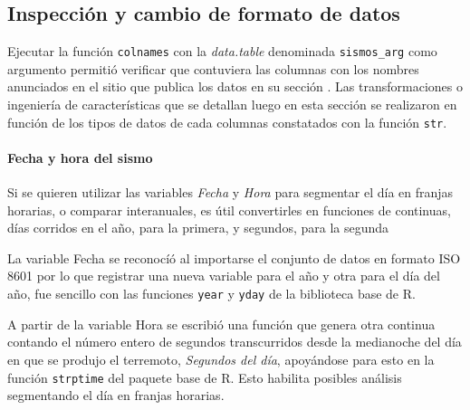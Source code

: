 \documentclass[a4paper]{report}
\begin{document}
\subsection{Inspección y cambio de formato de datos}\label{sec:formateo}
Ejecutar la función \lstinline[language=R,breaklines=true,basicstyle=\ttfamily]'colnames' con la \emph{data.table} denominada \lstinline[language=R,breaklines=true,basicstyle=\ttfamily]'sismos_arg' como argumento permitió verificar que contuviera las columnas con los nombres anunciados en el sitio que publica los datos en su sección \cite[Exploración inicial]{daniela_parada_ic-datasets-docencia_nodate}.
Las transformaciones o ingeniería de características que se detallan luego en esta sección se realizaron en función de los tipos de datos de cada columnas constatados con la función \lstinline[language=R,breaklines=true,basicstyle=\ttfamily]'str'.


\paragraph{Fecha y hora del sismo}
Si se quieren utilizar las variables \emph{Fecha} y \emph{Hora} para segmentar el día en franjas horarias, o comparar interanuales, es útil convertirles en funciones de continuas, días corridos en el año, para la primera, y segundos, para la segunda 

La variable Fecha se reconocíó al importarse el conjunto de datos en formato ISO 8601 por lo que registrar una nueva variable para el año y otra para el día del año, fue sencillo con las funciones \lstinline[language=R,breaklines=true,basicstyle=\ttfamily]'year' y \lstinline[language=R,breaklines=true,basicstyle=\ttfamily]'yday' de la biblioteca base de R. 

A partir de la variable Hora se escribió una función que genera otra continua contando el número entero de segundos transcurridos desde la medianoche del día en que se produjo el terremoto, \emph{Segundos del día}, apoyándose para esto en la función \lstinline[language=R,breaklines=true,basicstyle=\ttfamily]'strptime' del paquete base de R.
Esto habilita posibles análisis segmentando el día en franjas horarias.
\end{document}
